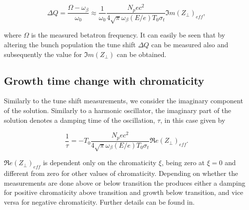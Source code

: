 \begin{equation}
\Delta Q = \frac{\Omega - \omega_{\beta}}{\omega_{0}} \approx \frac{1}{\omega_{0}} \frac{N_{p}ec^{2}}{4\sqrt{\pi}\omega_{\beta} \left( E/e \right)T_{0}\sigma_{t}} \Im{}m\left(  Z_{\perp} \right)_{eff},
\end{equation} 

where $\Omega$ is the measured betatron frequency. It can easily be seen that by altering the bunch population the tune shift $\Delta Q$ can be measured also and subsequently the value for $\Im{}m\left(  Z_{\perp} \right)$ can be obtained.

\subsection{Growth time change with chromaticity}
\label{sec:growth-time-chrom}

Similarly to the tune shift measurements, we consider the imaginary component of the solution. Similarly to a harmonic oscillator, the imaginary part of the solution denotes a damping time of the oscillation, $\tau$, in this case given by

\begin{equation}
\frac{1}{\tau} = -T_{0} \frac{N_{p}ec^{2}}{4\sqrt{\pi}\omega_{\beta} \left( E/e \right)T_{0}\sigma_{t}} \Re{}e\left(  Z_{\perp} \right)_{eff}.
\end{equation}

$\Re{}e\left(  Z_{\perp} \right)_{eff}$ is dependent only on the chromaticity $\xi$, being zero at $\xi = 0$ and different from zero for other values of chromaticity. Depending on whether the measurements are done above or below transition the produces either a damping for positive chromaticity above transition and growth below transition, and vice versa for negative chromaticity. Further details can be found in.